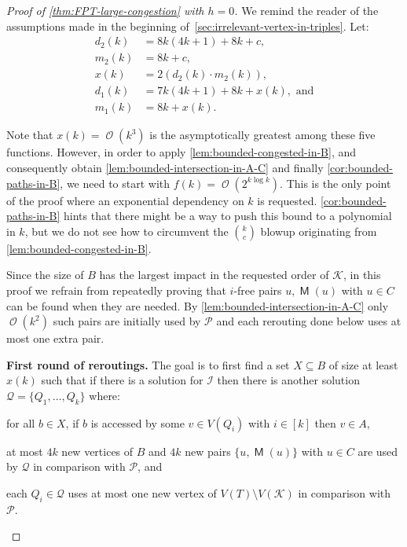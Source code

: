 \documentclass[a4paper,UKenglish,cleveref, autoref, thm-restate]{lipics-v2021}
\DeclareMathOperator{\Ocal}{\mathcal{O}\xspace}
\DeclareMathOperator{\Mat}{\mathsf M}
\begin{document}
\begin{proof}[Proof of \autoref{thm:FPT-large-congestion} with $h = 0$]
We remind the reader of the assumptions made in the beginning of~\autoref{sec:irrelevant-vertex-in-triples}.
Let:
\begin{align*}
  d_2(k) &= 8k(4k+1) + 8k + c,\\
  m_2(k) &= 8k + c,\\
  x(k) &= 2(d_2(k) \cdot m_2(k)),\\
d_1(k) &= 7k(4k+1) + 8k + x(k), \text{ and}\\
  m_1(k) &= 8k + x(k).
\end{align*}

Note that $x(k) = \Ocal(k^3)$ is the asymptotically greatest among these five functions.
However, in order to apply \autoref{lem:bounded-congested-in-B}, and consequently obtain \autoref{lem:bounded-intersection-in-A-C} and finally \autoref{cor:bounded-paths-in-B}, we need to start with $f(k) = \Ocal(2^{k \log k})$.
This is the only point of the proof where an exponential dependency on $k$ is requested. \autoref{cor:bounded-paths-in-B} hints that there might be a way to push this bound to a polynomial in $k$, but we do not see how to circumvent the $\binom{k}{c}$ blowup originating from \autoref{lem:bounded-congested-in-B}.

Since the size of $B$ has the largest impact in the requested order of $\mathcal{K}$, in this proof we refrain from repeatedly proving that $i$-free pairs ${u, \Mat(u)}$ with $u \in C$ can be found when they are needed.
By \autoref{lem:bounded-intersection-in-A-C} only $\Ocal(k^2)$ such pairs are initially used by $\mathcal{P}$ and each rerouting done below uses at most one extra pair.

\medskip
\noindent\textbf{First round of reroutings.}
The goal is to first find a set $X \subseteq B$ of size at least $x(k)$ such that if there is a solution for $\mathcal{I}$ then there is another solution $\mathcal{Q} = \{Q_1, \ldots, Q_k\}$ where:
\begin{romanenumerate}
  \item for all $b \in X$, if $b$ is accessed by some $v \in V(Q_i)$ with $i \in [k]$ then $v \in A$,
  \item at most $4k$ new vertices of $B$ and $4k$ new pairs $\{u, \Mat(u)\}$ with $u \in C$ are used by $\mathcal{Q}$ in comparison with $\mathcal{P}$, and
  \item each $Q_i \in \mathcal{Q}$ uses at most one new vertex of $V(T) \setminus V(\mathcal{K})$ in comparison with $\mathcal{P}$.
\end{romanenumerate}


\end{proof}
\end{document}
